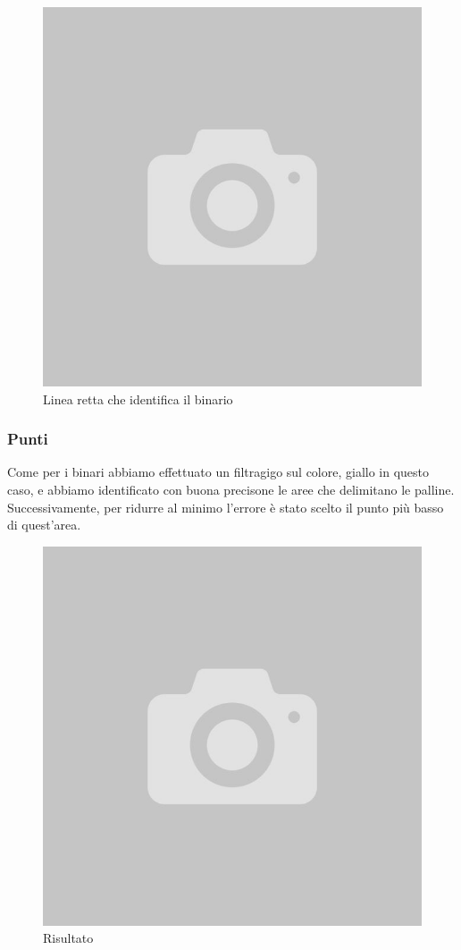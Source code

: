 \documentclass[twoside]{supsistudent}
\begin{document}
\begin{figure}[H]
  \center
  \includegraphics[scale=0.40]{images/empty.jpg}
  \caption{Linea retta che identifica il binario}
\end{figure}
\subsubsection{Punti}
Come per i binari abbiamo effettuato un filtragigo sul colore, giallo in questo caso, e abbiamo identificato con buona precisone 
le aree che delimitano le palline. Successivamente, per ridurre al minimo l'errore è stato scelto il punto più basso di quest'area. 
\begin{figure}[H]
  \center
  \includegraphics[scale=0.40]{images/empty.jpg}
  \caption{Risultato}
\end{figure}
\end{document}
